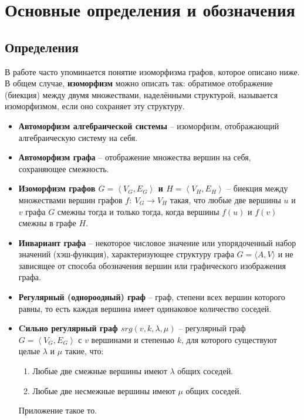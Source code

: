 \section{Основные определения и обозначения}
\label{sec:Definition_2} 
\large

\subsection{Определения}

В работе часто упоминается понятие изоморфизма графов, которое описано ниже. В общем случае, \textbf{изоморфизм} можно описать так: обратимое отображение (биекция) между двумя множествами, наделёнными структурой, называется изоморфизмом, если оно сохраняет эту структуру.

\begin{itemize}
\item \textbf{Автоморфизм алгебраической системы} -- изоморфизм, отображающий алгебраическую систему на себя.

\item \textbf{Автоморфизм графа} -- отображение множества вершин на себя, сохраняющее смежность.

\item \textbf{Изоморфизм графов $G=\left\langle V_{G},E_{G}\right\rangle$ и $H=\left\langle V_{H},E_{H}\right\rangle$} -- биекция между множествами вершин графов $f\colon \ V_{G}\rightarrow V_{H}$ такая, что любые две вершины $u$ и $v$ графа $G$ смежны тогда и только тогда, когда вершины $f(u)$ и $f(v)$ смежны в графе $H$.

\item \textbf{Инвариант графа} -- некоторое числовое значение или упорядоченный набор значений (хэш-функция), характеризующее структуру графа $ G=\langle A,V\rangle $  и не зависящее от способа обозначения вершин или графического изображения графа.

\item \textbf{Регулярный (однороодный) граф} -- граф, степени всех вершин которого равны, то есть каждая вершина имеет одинаковое количество соседей.

\item \textbf{Cильно регулярный граф $srg(v, k, \lambda, \mu)$} -- регулярный граф $G=\left\langle V_{G},E_{G}\right\rangle$ с $v$ вершинами и степенью $k$, для которого существуют целые $\lambda$ и $\mu$ такие, что:
\begin{enumerate}
\item Любые две смежные вершины имеют $\lambda$ общих соседей.
\item Любые две несмежные вершины имеют $\mu$ общих соседей.
\end{enumerate}
Приложение такое то.


\end{itemize}




